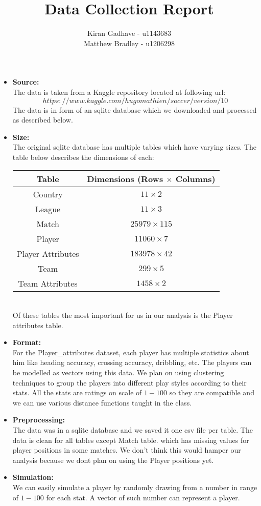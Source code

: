 \documentclass[11pt]{extarticle}
\title{Data Collection Report}
\author{Kiran Gadhave - u1143683\\Matthew Bradley - u1206298}
\newcommand{\<}{\langle}
\renewcommand{\>}{\rangle}
\theoremstyle{definition}
\begin{document}
\maketitle

\begin{itemize}

	\item \textbf{Source:}\\
	The data is taken from a Kaggle repository located at following url: 
	$$https://www.kaggle.com/hugomathien/soccer/version/10 $$
	The data is in form of an sqlite database which we downloaded and processed as described below.
	\item \textbf{Size:}\\
	The original sqlite database has multiple tables which have varying sizes. The table below describes the dimensions of each:
	\begin{table}[h!]
		\begin{center}
			\begin{tabular}{c|c}
				\textbf{Table} & \textbf{Dimensions (Rows $\times$ Columns)} \\
				\hline
				Country & $11 \times 2$\\
				League & $11 \times 3$\\
				Match & $25979 \times 115$\\
				Player & $11060 \times 7$\\
				Player Attributes & $183978 \times 42$\\
				Team & $299 \times 5$\\
				Team Attributes & $1458 \times 2$\\
			\end{tabular}
		\end{center}
	\end{table}
	\\
	Of these tables the most important for us in our analysis is the Player attributes table.
	\item \textbf{Format:}\\
	For the Player\_attributes dataset, each player has multiple statistics about him like heading accuracy, crossing accuracy, dribbling, etc. The players can be modelled as vectors using this data. We plan on using clustering techniques to group the players into different play styles according to their stats. All the stats are ratings on scale of $1-100$ so they are compatible and we can use various distance functions taught in the class.
	\item \textbf{Preprocessing:}\\
	The data was in a sqlite database and we saved it one csv file per table. The data is clean for all tables except Match table. which has missing values for player positions in some matches. We don't think this would hamper our analysis because we dont plan on using the Player positions yet.
	\item \textbf{Simulation:}\\
	We can easily simulate a player by randomly drawing from a number in range of $1-100$ for each stat. A vector of such number can represent a player.
\end{itemize}
\end{document}
